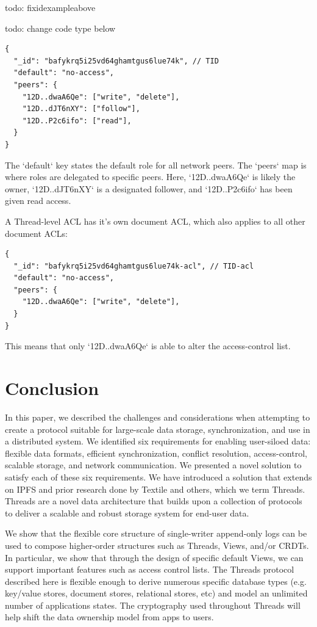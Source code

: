\documentclass{comjnl}
\begin{document}
todo: fixidexampleabove 

todo: change code type below

\begin{lstlisting}
{
  "_id": "bafykrq5i25vd64ghamtgus6lue74k", // TID
  "default": "no-access",
  "peers": {
    "12D..dwaA6Qe": ["write", "delete"],
    "12D..dJT6nXY": ["follow"],
    "12D..P2c6ifo": ["read"],
  }
}
\end{lstlisting}

The `default` key states the default role for all network peers. The `peers` map is where roles are delegated to specific peers. Here, `12D..dwaA6Qe` is likely the owner, `12D..dJT6nXY` is a designated follower, and `12D..P2c6ifo` has been given read access.

 A Thread-level ACL has it’s own document ACL, which also applies to all other document ACLs:


\begin{lstlisting}
{
  "_id": "bafykrq5i25vd64ghamtgus6lue74k-acl", // TID-acl
  "default": "no-access",
  "peers": {
    "12D..dwaA6Qe": ["write", "delete"],
  }
}
\end{lstlisting}

This means that only `12D..dwaA6Qe` is able to alter the access-control list.

\section{Conclusion}

In this paper, we described the challenges and considerations when attempting to create a protocol suitable for large-scale data storage, synchronization, and use in a distributed system. We identified six requirements for enabling user-siloed data: flexible data formats, efficient synchronization, conflict resolution, access-control, scalable storage, and network communication. We presented a novel solution to satisfy each of these six requirements. We have introduced a solution that extends on IPFS and prior research done by Textile and others, which we term Threads. Threads are a novel data architecture that builds upon a collection of protocols to deliver a scalable and robust storage system for end-user data. 

We show that the flexible core structure of single-writer append-only logs can be used to compose higher-order structures such as Threads, Views, and/or CRDTs. In particular, we show that through the design of specific default Views, we can support important features such as access control lists. The Threads protocol described here is flexible enough to derive numerous specific database types (e.g. key/value stores, document stores, relational stores, etc) and model an unlimited number of applications states. The cryptography used throughout Threads will help shift the data ownership model from apps to users. 
\end{document}
